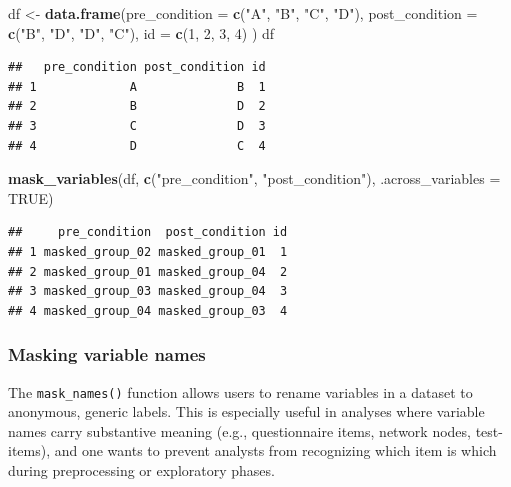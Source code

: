 \documentclass[
  english,
  man,floatsintext]{apa6}
\newenvironment{Shaded}{\begin{snugshade}}{\end{snugshade}}
\newcommand{\AttributeTok}[1]{\textcolor[rgb]{0.13,0.29,0.53}{#1}}
\newcommand{\ConstantTok}[1]{\textcolor[rgb]{0.56,0.35,0.01}{#1}}
\newcommand{\DecValTok}[1]{\textcolor[rgb]{0.00,0.00,0.81}{#1}}
\newcommand{\FunctionTok}[1]{\textcolor[rgb]{0.13,0.29,0.53}{\textbf{#1}}}
\newcommand{\NormalTok}[1]{#1}
\newcommand{\OtherTok}[1]{\textcolor[rgb]{0.56,0.35,0.01}{#1}}
\newcommand{\StringTok}[1]{\textcolor[rgb]{0.31,0.60,0.02}{#1}}
\begin{document}
\begin{Shaded}
\begin{Highlighting}[]
\NormalTok{df }\OtherTok{\textless{}{-}} \FunctionTok{data.frame}\NormalTok{(}\AttributeTok{pre\_condition =} \FunctionTok{c}\NormalTok{(}\StringTok{"A"}\NormalTok{, }\StringTok{"B"}\NormalTok{, }\StringTok{"C"}\NormalTok{, }\StringTok{"D"}\NormalTok{),}
                 \AttributeTok{post\_condition =} \FunctionTok{c}\NormalTok{(}\StringTok{"B"}\NormalTok{, }\StringTok{"D"}\NormalTok{, }\StringTok{"D"}\NormalTok{, }\StringTok{"C"}\NormalTok{),}
                 \AttributeTok{id =} \FunctionTok{c}\NormalTok{(}\DecValTok{1}\NormalTok{, }\DecValTok{2}\NormalTok{, }\DecValTok{3}\NormalTok{, }\DecValTok{4}\NormalTok{)}
\NormalTok{                 )}
\NormalTok{df}
\end{Highlighting}
\end{Shaded}

\begin{verbatim}
##   pre_condition post_condition id
## 1             A              B  1
## 2             B              D  2
## 3             C              D  3
## 4             D              C  4
\end{verbatim}

\begin{Shaded}
\begin{Highlighting}[]
\FunctionTok{mask\_variables}\NormalTok{(df, }
               \FunctionTok{c}\NormalTok{(}\StringTok{"pre\_condition"}\NormalTok{, }\StringTok{"post\_condition"}\NormalTok{),}
               \AttributeTok{.across\_variables =} \ConstantTok{TRUE}\NormalTok{)}
\end{Highlighting}
\end{Shaded}

\begin{verbatim}
##     pre_condition  post_condition id
## 1 masked_group_02 masked_group_01  1
## 2 masked_group_01 masked_group_04  2
## 3 masked_group_03 masked_group_04  3
## 4 masked_group_04 masked_group_03  4
\end{verbatim}

\subsubsection{Masking variable names}\label{masking-variable-names}

The \texttt{mask\_names()} function allows users to rename variables in a dataset to anonymous, generic labels. This is especially useful in analyses where variable names carry substantive meaning (e.g., questionnaire items, network nodes, test-items), and one wants to prevent analysts from recognizing which item is which during preprocessing or exploratory phases.
\end{document}

